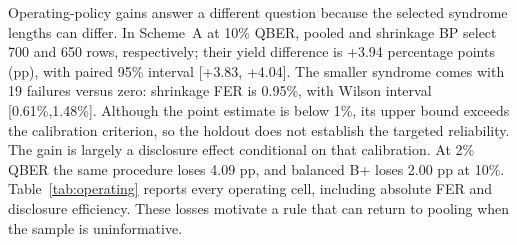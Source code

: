 Operating-policy gains answer a different question because the selected syndrome lengths
can differ. In Scheme~A at 10\% QBER, pooled and shrinkage BP select 700 and 650
rows, respectively; their yield difference is +3.94 percentage points (pp), with paired
95\% interval [+3.83, +4.04]. The smaller syndrome comes with 19 failures versus
zero: shrinkage FER is 0.95\%, with Wilson interval [0.61\%,1.48\%]. Although
the point estimate is below 1\%, its upper bound exceeds the calibration criterion,
so the holdout does not establish the targeted reliability. The gain is largely a
disclosure effect conditional on that calibration. At 2\% QBER the same procedure loses 4.09 pp, and balanced B+ loses
2.00 pp at 10\%. Table~\ref{tab:operating} reports every operating cell, including
absolute FER and disclosure efficiency. These losses motivate a rule that can return
to pooling when the sample is uninformative.

